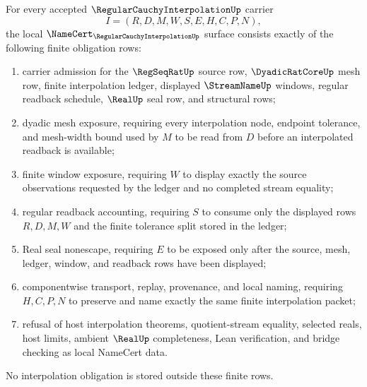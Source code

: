 \begin{theorem}
\label{thm:regular-cauchy-interpolation-namecert-obligations}
For every accepted $\RegularCauchyInterpolationUp$ carrier
$$
I=(R,D,M,W,S,E,H,C,P,N),
$$
the local $\NameCert_{\RegularCauchyInterpolationUp}$ surface consists exactly of the following finite obligation rows:
\begin{enumerate}
\item carrier admission for the $\RegSeqRatUp$ source row, $\DyadicRatCoreUp$ mesh row, finite interpolation ledger, displayed $\StreamNameUp$ windows, regular readback schedule, $\RealUp$ seal row, and structural rows;
\item dyadic mesh exposure, requiring every interpolation node, endpoint tolerance, and mesh-width bound used by $M$ to be read from $D$ before an interpolated readback is available;
\item finite window exposure, requiring $W$ to display exactly the source observations requested by the ledger and no completed stream equality;
\item regular readback accounting, requiring $S$ to consume only the displayed rows $R,D,M,W$ and the finite tolerance split stored in the ledger;
\item Real seal nonescape, requiring $E$ to be exposed only after the source, mesh, ledger, window, and readback rows have been displayed;
\item componentwise transport, replay, provenance, and local naming, requiring $H,C,P,N$ to preserve and name exactly the same finite interpolation packet;
\item refusal of host interpolation theorems, quotient-stream equality, selected reals, host limits, ambient $\RealUp$ completeness, Lean verification, and bridge checking as local NameCert data.
\end{enumerate}
No interpolation obligation is stored outside these finite rows.
\end{theorem}
